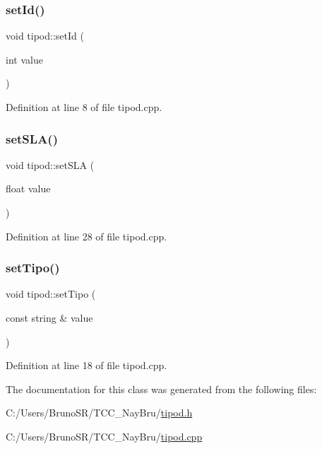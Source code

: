 \hypertarget{classtipod_ae3f6b8df170353ef58a862b746d3d288}{}\label{classtipod_ae3f6b8df170353ef58a862b746d3d288} 
\subsubsection{\texorpdfstring{set\+Id()}{setId()}}
{\footnotesize\ttfamily void tipod\+::set\+Id (\begin{DoxyParamCaption}\item[{int}]{value }\end{DoxyParamCaption})}



Definition at line 8 of file tipod.\+cpp.

\hypertarget{classtipod_ad0da4edb16cb79061875519e94b768d7}{}\label{classtipod_ad0da4edb16cb79061875519e94b768d7} 
\subsubsection{\texorpdfstring{set\+S\+L\+A()}{setSLA()}}
{\footnotesize\ttfamily void tipod\+::set\+S\+LA (\begin{DoxyParamCaption}\item[{float}]{value }\end{DoxyParamCaption})}



Definition at line 28 of file tipod.\+cpp.

\hypertarget{classtipod_ac1d39aaaa40c9c88611ed6274667dadb}{}\label{classtipod_ac1d39aaaa40c9c88611ed6274667dadb} 
\subsubsection{\texorpdfstring{set\+Tipo()}{setTipo()}}
{\footnotesize\ttfamily void tipod\+::set\+Tipo (\begin{DoxyParamCaption}\item[{const string \&}]{value }\end{DoxyParamCaption})}



Definition at line 18 of file tipod.\+cpp.



The documentation for this class was generated from the following files\+:\begin{DoxyCompactItemize}
\item 
C\+:/\+Users/\+Bruno\+S\+R/\+T\+C\+C\+\_\+\+Nay\+Bru/\hyperlink{tipod_8h}{tipod.\+h}\item 
C\+:/\+Users/\+Bruno\+S\+R/\+T\+C\+C\+\_\+\+Nay\+Bru/\hyperlink{tipod_8cpp}{tipod.\+cpp}\end{DoxyCompactItemize}
